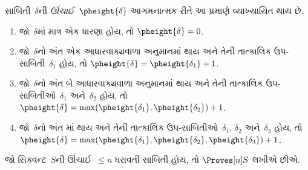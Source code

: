 \endgroup


\begin{defn}
સાબિતી~$\delta$ની
\emph{ઊંચાઈ}~$\pheight{\delta}$
આગમનાત્મક રીતે આ
પ્રમાણે વ્યાખ્યાયિત થાય છે.
\begin{enumerate}
  \item જો~$\delta$માં માત્ર
  એક ધારણા હોય, તો
  $\pheight{\delta} = 0$.
  \item જો~$\delta$નો અંત
  એક આધારવાક્યવાળા અનુમાનમાં
  થાય અને તેની તાત્કાલિક
  ઉપ-સાબિતી~$\delta_1$ હોય,
  તો $\pheight{\delta} = \pheight{\delta_1} + 1$.
  \item જો~$\delta$નો અંત
  બે આધારવાક્યવાળા અનુમાનમાં
  થાય અને તેની તાત્કાલિક
  ઉપ-સાબિતીઓ~$\delta_1$
  અને~$\delta_2$ હોય, તો
  $\pheight{\delta} =
  \max(\pheight{\delta_1}, \pheight{\delta_2}) + 1$.
  \item જો~$\delta$નો અંત
  \Elim{\lor}માં થાય
  અને તેની તાત્કાલિક
  ઉપ-સાબિતીઓ~$\delta_1$,
  $\delta_2$ અને~$\delta_3$
  હોય, તો
  $\pheight{\delta} =
  \max(\pheight{\delta_1}, \pheight{\delta_2}, \pheight{\delta_3}) + 1$.
\end{enumerate}
જો સિક્વન્ટ~$S$ની
ઊંચાઈ~$\le n$ ધરાવતી
સાબિતી હોય, તો
$\Proves[n] S$ લખીએ છીએ.
\end{defn}

